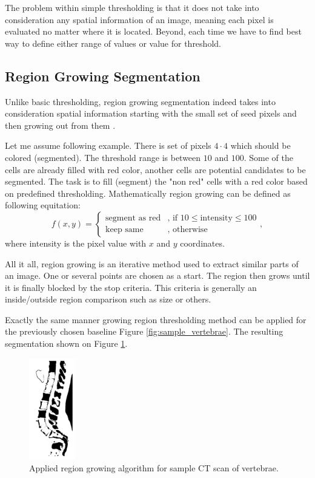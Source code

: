 The problem within simple thresholding is that it does not take into consideration any spatial information of an image, meaning each pixel is evaluated no matter where it is located. Beyond, each time we have to find best way to define either range of values or value for threshold.    

\subsection{Region Growing Segmentation}
Unlike basic thresholding, region growing segmentation indeed takes into consideration spatial information starting with the small set of seed pixels and then growing out from them \cite{Khaloo2017}. 

Let me assume following example. There is set of pixels $4 \cdot 4$ which should be colored (segmented). The threshold range is between $10$ and $100$. Some of the cells are already filled with red color, another cells are potential candidates to be segmented. The task is to fill (segment) the "non red" cells with a red color based on predefined thresholding. Mathematically region growing can be defined as following equitation: 
\[
    f(x, y) = 
\begin{cases}
    \text{segment as red} & \text{, if } 10 \leq \text{intensity} \leq 100 \\
    \text{keep same} & \text{, otherwise}
\end{cases}
,\]
where intensity is the pixel value with $x$ and $y$ coordinates. 

All it all, region growing is an iterative method used to extract similar parts of an image. One or several points are chosen as a start. The region then grows until it is finally blocked by the stop criteria. This criteria is generally an inside/outside region comparison such as size or others. 

Exactly the same manner growing region thresholding method can be applied for the previously chosen baseline Figure \ref{fig:sample_vertebrae}. The resulting segmentation shown on Figure \ref{fig:sample_vertebrae_grwoing}.

\begin{figure}[h]
    \centering \includegraphics[width=2cm]{images/sample_vertebrae_regiongrowing.png}
    \caption {Applied region growing algorithm for sample CT scan of vertebrae.}
    \label{fig:sample_vertebrae_grwoing}
\end{figure}    

